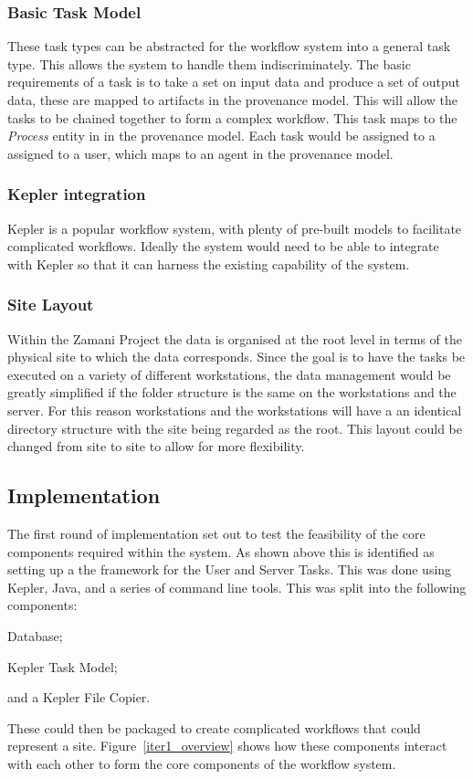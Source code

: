 \documentclass[12pt,a4paper]{report}
\begin{document}
\subsubsection*{Basic Task Model}
These task types can be abstracted for the workflow system into a general
task type. This allows the system to handle them indiscriminately. The basic
requirements of a task is to take a set on input data and produce a set
of output data, these are mapped to artifacts in the provenance model.
This will allow the tasks to be chained together to form
a complex workflow. This task maps to the \emph{Process} entity in in the
provenance model. Each task would be assigned to a assigned to a user, which
maps to an agent in the provenance model.

\subsubsection*{Kepler integration}
Kepler is a popular workflow system, with plenty of pre-built models to
facilitate complicated workflows. Ideally the system would need to be able
to integrate with Kepler so that it can harness the existing capability
of the system.

\subsubsection*{Site Layout}
Within the Zamani Project the data is organised at the root level in terms of
the physical site to which the data corresponds. Since the goal is to have the
tasks be executed on a variety of different workstations, the data management
would be greatly simplified if the folder structure is the same on the workstations
and the server. For this reason workstations and the workstations will have a
an identical directory structure with the site being regarded as the root. This
layout could be changed from site to site to allow for more flexibility.

\subsection{Implementation}

The first round of implementation set out to test the feasibility of the
core components required within the system. As shown above this is identified
as setting up a the framework for the User and Server Tasks. This was done using
Kepler, Java, and a series of command line tools. This was split into the following
components: \begin{inparaenum}[(i)] \item Database; \item Kepler Task Model;
\item and a Kepler File Copier. \end{inparaenum} These could then be packaged
to create complicated workflows that could represent a site.
Figure~\ref{iter1_overview} shows how these components interact with each
other to form the core components of the workflow system.
\end{document}
